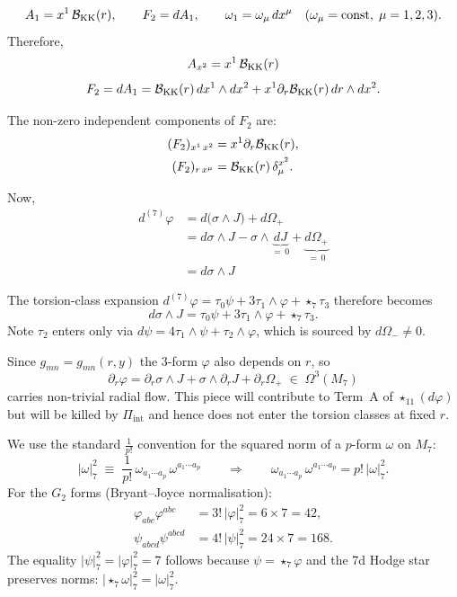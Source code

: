 \documentclass[a4paper,11pt,fleqn]{article}
\theoremstyle{plain}
\theoremstyle{definition}
\newcommand{\vp}{\varphi}
\newcommand{\ps}{\psi}
\newcommand{\ta}{\tau}
\newcommand{\Nf}{{\cal B}_{\rm KK}(r)}
\newcommand{\Pint}{\Pi_{\mathrm{int}}}
\newcommand{\str}{\star_7}
\newcommand{\sEl}{\star_{11}}
\begin{document}
\[
  A_1 = x^1\,{\cal B}_{\rm KK}(r),
  \qquad
  F_2 = dA_1,
  \qquad
  \omega_1 = \omega_\mu\,dx^\mu
  \quad(\omega_\mu = \mathrm{const},\;\mu=1,2,3).
\]
Therefore,
\[
  A_{x^2} = x^1\,{\cal B}_{\rm KK}(r)
\]
\[
  F_2 = dA_1
  = \Nf\,dx^1\wedge dx^2
  + x^1\partial_r\Nf\,dr\wedge dx^2.
\]

\noindent
The non-zero independent components of $F_2$ are:
\begin{align}
  (F_2)_{x^1\,x^2}       &= x^1\partial_r\Nf,
    \label{eq:F_xr}\\
  (F_2)_{r\,x^\mu}   &= \Nf\,\delta^{x^2}_\mu.
    \label{eq:F_xx}
\end{align}



Now,
\begin{align*}
  d^{(7)}\vp
  &= d\bigl(\sigma\wedge J\bigr) + d\Omega_+ \\
  &= d\sigma\wedge J
     - \sigma\wedge\underbrace{dJ}_{=\,0}
     + \underbrace{d\Omega_+}_{=\,0} \\
  &= d\sigma\wedge J
\end{align*}

\noindent
The torsion-class expansion $d^{(7)}\vp = \ta_0\ps+3\ta_1\wedge\vp+\str\ta_3$
therefore becomes
\[
  d\sigma\wedge J = \ta_0\ps + 3\ta_1\wedge\vp + \str\ta_3.
\]
Note $\tau_2$ enters only via
$d\ps = 4\ta_1\wedge\ps + \ta_2\wedge\vp$,
which is sourced by $d\Omega_-\neq 0$.



Since $g_{mn}=g_{mn}(r,y)$ the 3-form $\vp$ also depends on $r$, so
\[
  \partial_r\vp = \partial_r\sigma\wedge J + \sigma\wedge\partial_r J
               + \partial_r\Omega_+
  \;\in\;\Omega^3(M_7)
\]
carries non-trivial radial flow.
This piece will contribute to Term~A of $\sEl(d\vp)$ but will be killed by $\Pint$ and hence does not enter the torsion classes at fixed $r$.


We use the standard $\frac{1}{p!}$ convention for the squared norm of a
$p$-form $\omega$ on $M_7$:
\[
  |\omega|^2_7 \;\equiv\; \frac{1}{p!}\,\omega_{a_1\cdots a_p}\,\omega^{a_1\cdots a_p}
  \qquad\Longrightarrow\qquad
  \omega_{a_1\cdots a_p}\,\omega^{a_1\cdots a_p} = p!\,|\omega|^2_7.
\]
For the $G_2$ forms (Bryant--Joyce normalisation):
\begin{align}
  \vp_{abc}\vp^{abc} &= 3!\,|\vp|^2_7 = 6\times 7 = 42,
  \label{eq:norm_phi}\\
  \ps_{abcd}\ps^{abcd} &= 4!\,|\ps|^2_7 = 24\times 7 = 168.
  \label{eq:norm_psi}
\end{align}
The equality $|\ps|^2_7 = |\vp|^2_7 = 7$ follows because
$\ps=\str\vp$ and the 7d Hodge star preserves norms:
$|\str\omega|^2_7 = |\omega|^2_7$.
\end{document}
